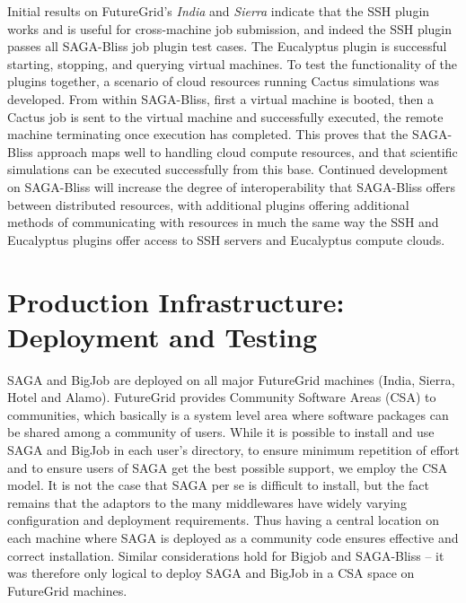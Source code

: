 \documentclass[]{paper}
\begin{document}
Initial results on FutureGrid's \textit{India} and \textit{Sierra} indicate
that the SSH plugin works and is useful for cross-machine job submission, and
indeed the SSH plugin passes all SAGA-Bliss job plugin test cases.  The
Eucalyptus plugin is successful starting, stopping, and querying virtual
machines.  To test the functionality of the plugins together, a scenario of
cloud resources running Cactus simulations was developed.  From within
SAGA-Bliss, first a virtual machine is booted, then a Cactus job is sent to the
virtual machine and successfully executed, the remote machine terminating once
execution has completed.  This proves that the SAGA-Bliss approach maps well to
handling cloud compute resources, and that scientific simulations can be
executed successfully from this base.  Continued development on SAGA-Bliss will
increase the degree of interoperability that SAGA-Bliss offers between
distributed resources, with additional plugins offering additional methods of
communicating with resources in much the same way the SSH and Eucalyptus
plugins offer access to SSH servers and Eucalyptus compute clouds.


\section{Production Infrastructure: Deployment and Testing}

SAGA and BigJob are deployed on all major FutureGrid machines (India,
Sierra, Hotel and Alamo).  FutureGrid provides Community Software
Areas (CSA) to communities, which basically is a system level area
where software packages can be shared among a community of users.
While it is possible to install and use SAGA and BigJob in each user's
directory, to ensure minimum repetition of effort and to ensure users
of SAGA get the best possible support, we employ the CSA model.  It is
not the case that SAGA per se is difficult to install, but the fact
remains that the adaptors to the many middlewares have widely varying
configuration and deployment requirements.  Thus having a central
location on each machine where SAGA is deployed as a community code
ensures effective and correct installation.  Similar considerations
hold for Bigjob and SAGA-Bliss -- it was therefore only logical to deploy
SAGA and BigJob in a CSA space on FutureGrid machines.
\end{document}
